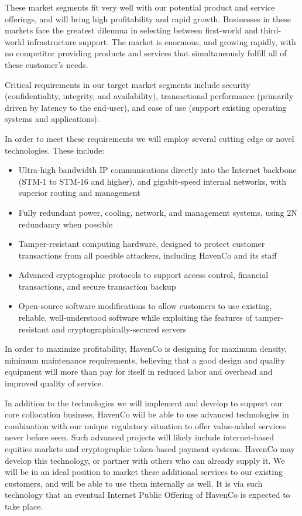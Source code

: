 These market segments fit very well with our potential product and service offerings, and will bring high profitability and rapid growth.  Businesses in these markets face the greatest dilemma in selecting between first-world and third-world infrastructure support. The market is enormous, and growing rapidly, with no competitor providing products and services that simultaneously fulfill all of these customer's needs.

Critical requirements in our target market segments include security (confidentiality, integrity, and availability), transactional performance (primarily driven by latency to the end-user), and ease of use (support existing operating systems and applications).

In order to meet these requirements we will employ several cutting edge or novel technologies.  These include:

\begin{itemize}
\item Ultra-high bandwidth IP communications directly into the Internet backbone (STM-1 to STM-16 and higher), and gigabit-speed internal networks, with superior routing and management
\item Fully redundant power, cooling, network, and management systems, using 2N redundancy when possible
\item Tamper-resistant computing hardware, designed to protect customer transactions from all possible attackers, including HavenCo and its staff
\item Advanced cryptographic protocols to support access control, financial transactions, and secure transaction backup 
\item Open-source software modifications to allow customers to use existing, reliable, well-understood software while exploiting the features of tamper-resistant and cryptographically-secured servers
\end{itemize}

In order to maximize profitability, HavenCo is designing for maximum density, minimum maintenance requirements, believing that a good design and quality equipment will more than pay for itself in reduced labor and overhead and improved quality of service.

In addition to the technologies we will implement and develop to support our core collocation business, HavenCo will be able to use advanced technologies in combination with our unique regulatory situation to offer value-added services never before seen. Such advanced projects will likely include internet-based equities markets and cryptographic token-based payment systems. HavenCo may develop this technology, or partner with others who can already supply it. We will be in an ideal position to market these additional services to our existing customers, and will be able to use them internally as well. It is via such technology that an eventual Internet Public Offering of HavenCo is expected to take place.


